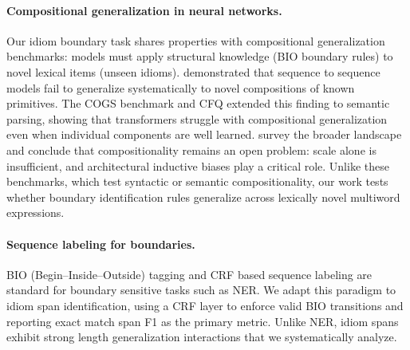 \documentclass[11pt, a4paper]{report}
\begin{document}
\paragraph{Compositional generalization in neural networks.}
Our idiom boundary task shares properties with compositional generalization benchmarks: models must apply structural knowledge (BIO boundary rules) to novel lexical items (unseen idioms). \citet{lake2018generalization} demonstrated that sequence to sequence models fail to generalize systematically to novel compositions of known primitives. The COGS benchmark \citep{kim2020cogs} and CFQ \citep{keysers2020measuring} extended this finding to semantic parsing, showing that transformers struggle with compositional generalization even when individual components are well learned. \citet{mccurdy2024compositional} survey the broader landscape and conclude that compositionality remains an open problem: scale alone is insufficient, and architectural inductive biases play a critical role. Unlike these benchmarks, which test syntactic or semantic compositionality, our work tests whether boundary identification rules generalize across lexically novel multiword expressions.

\paragraph{Sequence labeling for boundaries.}
BIO (Begin--Inside--Outside) tagging \citep{ramshaw1995text} and CRF based sequence labeling \citep{lample2016neural} are standard for boundary sensitive tasks such as NER. We adapt this paradigm to idiom span identification, using a CRF layer to enforce valid BIO transitions and reporting exact match span F1 as the primary metric. Unlike NER, idiom spans exhibit strong length generalization interactions that we systematically analyze.
\end{document}
